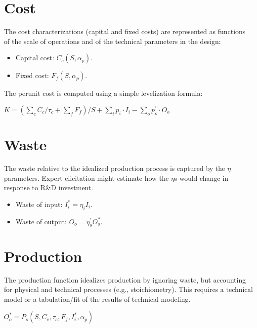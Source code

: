\documentclass[letterpaper,10pt,english]{sphinxmanual}
\begin{document}
\section{Cost}
\label{\detokenize{formulation:cost}}
\sphinxAtStartPar
The cost characterizations (capital and fixed costs) are represented as
functions of the scale of operations and of the technical parameters in
the design:
\begin{itemize}
\item {} 
\sphinxAtStartPar
Capital cost: \(C_c(S, \alpha_p)\).

\item {} 
\sphinxAtStartPar
Fixed cost: \(F_f(S, \alpha_p)\).

\end{itemize}

\sphinxAtStartPar
The per\sphinxhyphen{}unit cost is computed using a simple levelization formula:

\sphinxAtStartPar
\(K = \left( \sum_c C_c / \tau_c + \sum_f F_f \right) / S + \sum_i p_i \cdot I_i - \sum_o p^\prime_o \cdot O_o\)


\section{Waste}
\label{\detokenize{formulation:waste}}
\sphinxAtStartPar
The waste relative to the idealized production process is captured by
the \(\eta\) parameters. Expert elicitation might estimate how the
\(\eta\)s would change in response to R\&D investment.
\begin{itemize}
\item {} 
\sphinxAtStartPar
Waste of input: \(I^*_i = \eta_i I_i\).

\item {} 
\sphinxAtStartPar
Waste of output: \(O_o = \eta^\prime_o O^*_o\).

\end{itemize}


\section{Production}
\label{\detokenize{formulation:production}}
\sphinxAtStartPar
The production function idealizes production by ignoring waste, but
accounting for physical and technical processes (e.g., stoichiometry).
This requires a technical model or a tabulation/fit of the results of
technical modeling.

\sphinxAtStartPar
\(O^*_o = P_o(S, C_c, \tau_c, F_f, I^*_i, \alpha_p)\)
\end{document}
